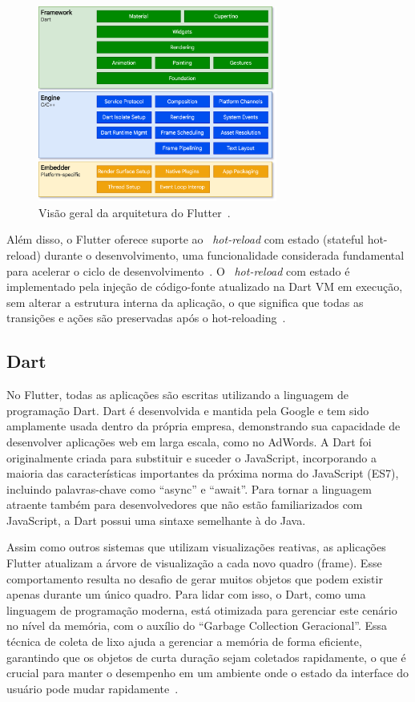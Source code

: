 \begin{figure}
    \centering
    \includegraphics[width=0.7\textwidth]{imagens/flutter_architecture}
    \caption{Visão geral da arquitetura do Flutter~\cite{flutter}.}
    \label{fig:architecture}
\end{figure}

Além disso, o Flutter oferece suporte ao ~\textit{hot-reload} com estado (stateful hot-reload) durante o desenvolvimento, uma funcionalidade considerada fundamental para acelerar o ciclo de desenvolvimento~\cite{wu2018react}.
O ~\textit{hot-reload} com estado é implementado pela injeção de código-fonte atualizado na Dart VM em execução, sem alterar a estrutura interna da aplicação, o que significa que todas as transições e ações são preservadas após o hot-reloading~\cite{flutter}.

\subsection{Dart}\label{subsec: dart}
No Flutter, todas as aplicações são escritas utilizando a linguagem de programação Dart.
Dart é desenvolvida e mantida pela Google e tem sido amplamente usada dentro da própria empresa, demonstrando sua capacidade de desenvolver aplicações web em larga escala, como no AdWords.
A Dart foi originalmente criada para substituir e suceder o JavaScript, incorporando a maioria das características importantes da próxima norma do JavaScript (ES7), incluindo palavras-chave como “async” e “await”.
Para tornar a linguagem atraente também para desenvolvedores que não estão familiarizados com JavaScript, a Dart possui uma sintaxe semelhante à do Java.

Assim como outros sistemas que utilizam visualizações reativas, as aplicações Flutter atualizam a árvore de visualização a cada novo quadro (frame).
Esse comportamento resulta no desafio de gerar muitos objetos que podem existir apenas durante um único quadro.
Para lidar com isso, o Dart, como uma linguagem de programação moderna, está otimizada para gerenciar este cenário no nível da memória, com o auxílio do “Garbage Collection Geracional”.
Essa técnica de coleta de lixo ajuda a gerenciar a memória de forma eficiente, garantindo que os objetos de curta duração sejam coletados rapidamente, o que é crucial para manter o desempenho em um ambiente onde o estado da interface do usuário pode mudar rapidamente~\cite{flutter}.

